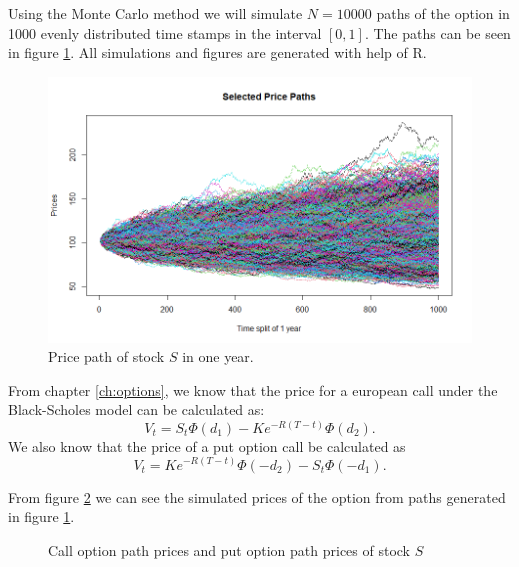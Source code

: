 \documentclass[a4paper, 12pt]{article}
\theoremstyle{definition}
\theoremstyle{plain}
\theoremstyle{definition}
\begin{document}
Using the Monte Carlo method we will simulate 
$N = 10000$ paths of the option in 1000 evenly 
distributed time stamps in the interval $[0,1]$.
The paths can be seen in 
figure \ref{fig:price_path}. All 
simulations and figures 
are generated with help of R.

\begin{figure}[!ht]
    \centering
    \caption{Price path of stock $S$ in one year.}
    \label{fig:price_path}
    \includegraphics[scale=0.65]{price_paths.png}
 \end{figure}
 
From chapter \ref{ch:options}, we know 
that the price for a european call under the Black-Scholes model
can be calculated as:
$$
    V_t = S_t\Phi(d_1) - Ke^{-R(T-t)}\Phi(d_2).
$$
We also know that the price of a put option call be calculated as
$$
    V_t = Ke^{-R(T-t)}\Phi(-d_2)-S_t\Phi(-d_1).
$$    

From figure \ref{fig:option_prices} we can see 
the simulated prices
of the option from paths 
generated in figure \ref{fig:price_path}. 

\begin{figure}[ht!]
    \centering

    \caption{Call option path prices 
            and put option path prices of stock $S$}
 \label{fig:option_prices}
 \end{figure}
 
\end{document}

